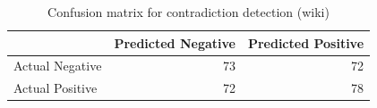 \begin{table}
\caption{Confusion matrix for contradiction detection (wiki)}
\label{tab:confusion_matrix}
\begin{tabular}{lrr}
\toprule
 & Predicted Negative & Predicted Positive \\
\midrule
Actual Negative & 73 & 72 \\
Actual Positive & 72 & 78 \\
\bottomrule
\end{tabular}
\end{table}
